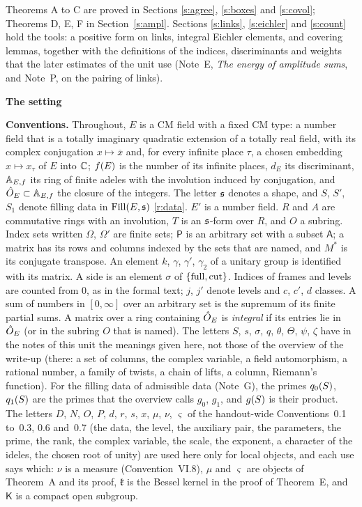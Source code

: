 \documentclass[11pt,a4paper]{article}
\newcommand{\sect}[2]{\refstepcounter{section}\label{#2}\par\addvspace{19pt plus 4pt minus 2pt}\Needspace{7\baselineskip}%
  \noindent\llap{{\fontsize{13.2}{16}\selectfont\bfseries\color{inkfaint}\thesection}\hspace{9pt}}%
  {\fontsize{13.2}{16}\selectfont\bfseries\color{ink}#1}\par\nopagebreak\vspace{-1pt}}
\theoremstyle{plainx}
\theoremstyle{uprightx}
\newenvironment{conventions}{\par\addvspace{5pt}\noindent\textbf{Conventions.}\enspace\ignorespaces}{\par\addvspace{3pt}}
\newcommand{\cj}[1]{\overline{#1}}
\newcommand{\sP}{\mathsf{P}}
\newcommand{\sA}{\mathsf{A}}
\begin{document}
Theorems A to C are proved in Sections \ref{s:agree}, \ref{s:boxes} and \ref{s:covol}; Theorems D, E, F in
Section~\ref{s:ampl}. Sections \ref{s:links}, \ref{s:eichler} and \ref{s:count} hold the tools: a positive form on
links, integral Eichler elements, and covering lemmas, together with the definitions of the indices,
discriminants and weights that the later estimates of the unit use (Note~E, \emph{The energy of amplitude sums},
and Note~P, on the pairing of links).

\sect{The setting}{s:setting}
\begin{conventions}\label{c:conventions}
Throughout, $E$ is a CM field with a fixed CM type: a number field that is a totally imaginary quadratic extension
of a totally real field, with its complex conjugation $x\mapsto\cj{x}$ and, for every infinite place $\tau$, a chosen
embedding $x\mapsto x_\tau$ of $E$ into $\CC$; $\ninf{E}$ is the number of its infinite places, $d_E$ its
discriminant, $\AEf$ its ring of finite adeles with the involution induced by conjugation, and $\hO\subset\AEf$ the
closure of the integers. The letter $\fs$ denotes a shape, and $S$, $S'$, $S_1$ denote filling data in
$\Fill{E}{\fs}$ \ref{r:data}. $E'$ is a number field. $R$ and $A$ are commutative rings with an involution,
$T$ is an $\fs$-form over $R$, and $O$ a subring. Index sets written $\Omega$, $\Omega'$ are finite sets; $\sP$ is
an arbitrary set with a subset $\sA$; a matrix has its rows and columns indexed by the sets that are named, and
$M^{*}$ is its conjugate transpose. An element $k$, $\gamma$, $\gamma'$, $\gamma_2$ of a unitary group is
identified with its matrix. A side is an element $\sigma$ of $\{\full,\cut\}$. Indices of frames and levels are
counted from $0$, as in the formal text; $j$, $j'$ denote levels and $c$, $c'$, $d$ classes. A sum of numbers in
$[0,\infty]$ over an arbitrary set is the supremum of its finite partial sums. A matrix over a ring
containing $\hO$ is \emph{integral} if its entries lie in $\hO$ (or in the subring $O$ that is named). The letters
$S$, $s$, $\sigma$, $q$, $\theta$, $\Theta$, $\psi$, $\zeta$ have in the notes of this unit the meanings given here,
not those of the overview of the write-up (there: a set of columns, the complex variable, a field automorphism, a
rational number, a family of twists, a chain of lifts, a column, Riemann's function). For the filling data of
admissible data (Note~G), the primes $\qS{S}{0}$, $\qS{S}{1}$ are the primes that the overview calls $g_0$, $g_1$, and
$\gS{S}$ is their product. The letters $D$, $N$, $O$, $P$, $d$, $r$, $s$, $x$, $\mu$, $\nu$, $\varsigma$ of the handout-wide Conventions~0.1 to~0.3,
0.6 and~0.7 (the data, the level, the auxiliary pair, the parameters, the prime, the rank, the complex variable, the scale, the
exponent, a character of the ideles, the chosen root of unity) are used here only for local objects, and each use says which: $\nu$ is a
measure (Convention~VI.8), $\mu$ and $\varsigma$ are objects of Theorem~A and its proof, $\mathfrak k$ is the Bessel kernel in the proof of
Theorem~E, and $\mathsf K$ is a compact open subgroup.
\end{conventions}
\end{document}
